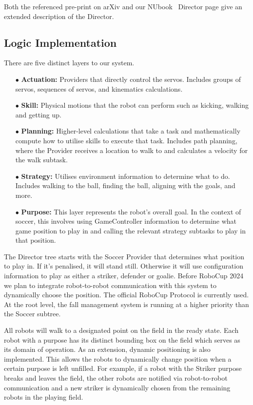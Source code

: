 \documentclass{llncs}
\begin{document}
Both the referenced pre-print on arXiv and our NUbook~\cite{nubotsNUbookGit} Director page give an extended description of the Director.

\subsection{Logic Implementation}

There are five distinct layers to our system.

\begin{itemize}
    \item[$\bullet$] \textbf{Actuation:} Providers that directly control the servos. Includes groups of servos, sequences of servos, and kinematics calculations.
    \item[$\bullet$] \textbf{Skill:} Physical motions that the robot can perform such as kicking, walking and getting up.
    \item[$\bullet$] \textbf{Planning:} Higher-level calculations that take a task and mathematically compute how to utilise skills to execute that task. Includes path planning, where the Provider receives a location to walk to and calculates a velocity for the walk subtask.
    \item[$\bullet$] \textbf{Strategy:} Utilises environment information to determine what to do. Includes walking to the ball, finding the ball, aligning with the goals, and more.
    \item[$\bullet$] \textbf{Purpose:} This layer represents the robot's overall goal. In the context of soccer, this involves using GameController information to determine what game position to play in and calling the relevant strategy subtasks to play in that position.
\end{itemize}

The Director tree starts with the Soccer Provider that determines what position to play in. If it's penalised, it will stand still. Otherwise it will use configuration information to play as either a striker, defender or goalie. Before RoboCup 2024 we plan to integrate robot-to-robot communication with this system to dynamically choose the position. The official RoboCup Protocol is currently used. At the root level, the fall management system is running at a higher priority than the Soccer subtree.

All robots will walk to a designated point on the field in the ready state. Each robot with a purpose has its distinct bounding box on the field which serves as its domain of operation. As an extension, dynamic positioning is also implemented. This allows the robots to dynamically change position when a certain purpose is left unfilled. For example, if a robot with the Striker purpose breaks and leaves the field, the other robots are notified via robot-to-robot communication and a new striker is dynamically chosen from the remaining robots in the playing field.
\end{document}
